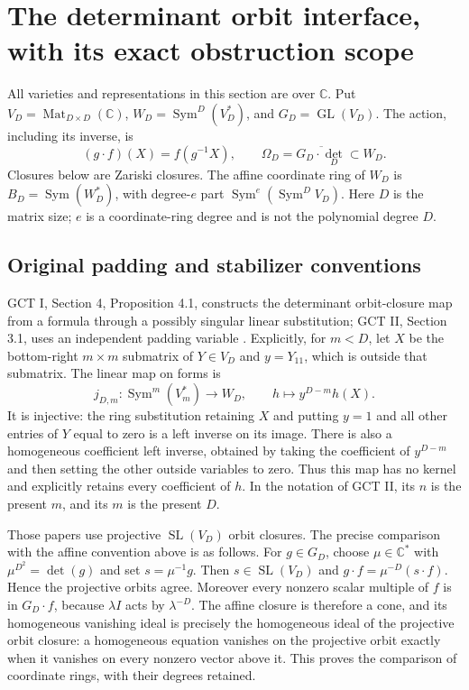 \section{The determinant orbit interface, with its exact obstruction scope}
\label{sec:gct-obstruction-interface}

All varieties and representations in this section are over $\mathbb C$.
Put $V_D=\operatorname{Mat}_{D\times D}(\mathbb C)$,
$W_D=\operatorname{Sym}^D(V_D^*)$, and $G_D=\operatorname{GL}(V_D)$.
The action, including its inverse, is
\[
 (g\cdot f)(X)=f(g^{-1}X),\qquad
 \Omega_D=\overline{G_D\cdot\det_D}\subset W_D.
\]
Closures below are Zariski closures. The affine coordinate ring of $W_D$
is $B_D=\operatorname{Sym}(W_D^*)$, with degree-$e$ part
$\operatorname{Sym}^e(\operatorname{Sym}^D V_D)$.
Here $D$ is the matrix size; $e$ is a coordinate-ring degree and is
not the polynomial degree $D$.

\subsection{Original padding and stabilizer conventions}

GCT I, Section 4, Proposition 4.1, constructs the determinant orbit-closure
map from a formula through a possibly singular linear substitution;
GCT II, Section 3.1, uses an independent padding variable
\cite{MS2001Interface,MS2006Interface}. Explicitly, for $m<D$, let
$X$ be the bottom-right $m\times m$ submatrix of $Y\in V_D$ and
$y=Y_{11}$, which is outside that submatrix. The linear map on forms is
\[
 j_{D,m}:\operatorname{Sym}^m(V_m^*)\longrightarrow W_D,
 \qquad h\longmapsto y^{D-m}h(X).
\]
It is injective: the ring substitution retaining $X$ and putting $y=1$
and all other entries of $Y$ equal to zero is a left inverse on its
image. There is also a homogeneous coefficient left inverse, obtained
by taking the coefficient of $y^{D-m}$ and then setting the other
outside variables to zero. Thus this map has no kernel and explicitly
retains every coefficient of $h$. In the notation of GCT II, its $n$
is the present $m$, and its $m$ is the present $D$.

Those papers use projective $\operatorname{SL}(V_D)$ orbit closures.
The precise comparison with the affine convention above is as follows.
For $g\in G_D$, choose $\mu\in\mathbb C^*$ with
$\mu^{D^2}=\det(g)$ and set $s=\mu^{-1}g$. Then
$s\in\operatorname{SL}(V_D)$ and
$g\cdot f=\mu^{-D}(s\cdot f)$. Hence the projective orbits agree.
Moreover every nonzero scalar multiple of $f$ is in $G_D\cdot f$,
because $\lambda I$ acts by $\lambda^{-D}$. The affine closure is
therefore a cone, and its homogeneous vanishing ideal is precisely the
homogeneous ideal of the projective orbit closure: a homogeneous equation
vanishes on the projective orbit exactly when it vanishes on every
nonzero vector above it. This proves the comparison of coordinate rings,
with their degrees retained.


